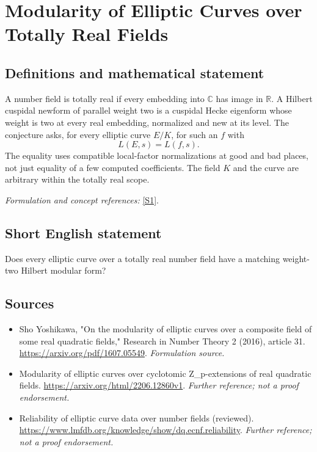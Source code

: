 \documentclass[11pt]{article}
\begin{document}
\section*{\texorpdfstring{Modularity of Elliptic Curves over Totally Real Fields}{Modularity of Elliptic Curves over Totally Real Fields}}\label{30006706}
\subsection{Definitions and mathematical statement}
A number field is totally real if every embedding into ${\mathbb{C}}$ has image in ${\mathbb{R}}$. A Hilbert cuspidal newform of parallel weight two is a cuspidal Hecke eigenform whose weight is two at every real embedding, normalized and new at its level. The conjecture asks, for every elliptic curve $E/K$, for such an $f$ with
\[
 L(E,s)=L(f,s).
\]
The equality uses compatible local-factor normalizations at good and bad places, not just equality of a few computed coefficients. The field $K$ and the curve are arbitrary within the totally real scope.
\par\smallskip\textit{Formulation and concept references:} \href{https://arxiv.org/pdf/1607.05549}{[S1]}.

\subsection{Short English statement}
Does every elliptic curve over a totally real number field have a matching weight-two Hilbert modular form?
\subsection{Sources}
\begin{itemize}
\item[S1]Sho Yoshikawa, "On the modularity of elliptic curves over a composite field of some real quadratic fields," Research in Number Theory 2 (2016), article 31.
\url{https://arxiv.org/pdf/1607.05549}.
\textit{Formulation source.}
\item[S2]Modularity of elliptic curves over cyclotomic Z\_p-extensions of real quadratic fields.
\url{https://arxiv.org/html/2206.12860v1}.
\textit{Further reference; not a proof endorsement.}
\item[S3]Reliability of elliptic curve data over number fields (reviewed).
\url{https://www.lmfdb.org/knowledge/show/dq.ecnf.reliability}.
\textit{Further reference; not a proof endorsement.}
\end{itemize}
\end{document}

